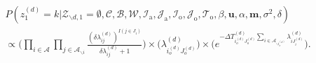 \documentclass[a4paper]{article}
\begin{document}
  \begin{equation}
  \begin{aligned}
  &P(z^{(d)}_1=k|\mathcal{Z}_{\backslash d, 1}=\emptyset,   \mathcal{C},   \mathcal{B},\mathcal{W}, \mathcal{I}_{\mbox{a}}, \mathcal{J}_{\mbox{a}}, \mathcal{I}_{\mbox{o}}, \mathcal{J}_{\mbox{o}}, \mathcal{T}_{\mbox{o}}, \beta, \boldsymbol{u}, \alpha, \boldsymbol{m}, \sigma^2,  \delta)\\&\propto\Big(\prod_{i\in \mathcal{A}}\prod_{j \in \mathcal{A}_{\backslash i }} \frac{(\delta\lambda^{(d)}_{ij})^{I(j \in J_i)}}{\delta\lambda^{(d)}_{ij}+1}\Big)\times \Big(\lambda^{(d)}_{i_o^{(d)}J_{o}^{(d)}}\Big)\times  \Big(e^{-\Delta T^{(d)}_{i_o^{(d)}J_o^{(d)}}\sum\limits_{i\in \mathcal{A}_{\backslash i_o^{(d)}}}\lambda^{(d)}_{iJ^{(d)}_{i}}}\Big).
  \end{aligned}
  \end{equation}
\end{document}
